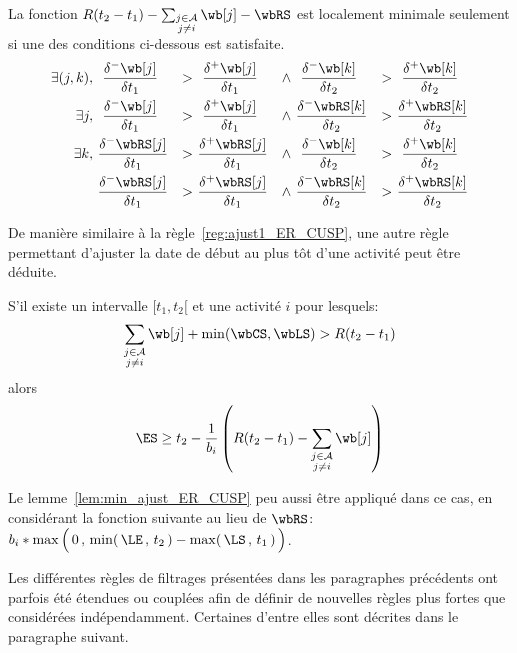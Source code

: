 \begin{lemma}
\label{lem:min_ajust_ER_CUSP}
La fonction $R(t_2-t_1) -\sum_{\substack{j \in \A \\ j \neq i}} \wb[j]
- \wbRS $ est localement minimale seulement si une des conditions
ci-dessous est satisfaite.
\begin{align} 
\exists (j,k), \ &~\frac{\delta^{-}\wb[j]}{\delta t_1}
&>~&~\frac{\delta^{+}\wb[j]}{\delta t_1}
&\land~&~\frac{\delta^{-}\wb[k]}{\delta t_2} & >~&
~\frac{\delta^{+}\wb[k]}{\delta t_2} \label{eq:deriv1_adj_CUSP}\\
\exists j , \ &~\frac{\delta^{-}\wb[j]}{\delta t_1}
&>~&~\frac{\delta^{+}\wb[j]}{\delta t_1}
&\land~&\frac{\delta^{-}\wbRS[k]}{\delta t_2} & >~&
\frac{\delta^{+}\wbRS[k]}{\delta t_2} \label{eq:deriv2_adj_CUSP}\\
\exists k, \ &\frac{\delta^{-}\wbRS[j]}{\delta t_1}
&>~&\frac{\delta^{+}\wbRS[j]}{\delta t_1}
&\land~&~\frac{\delta^{-}\wb[k]}{\delta t_2} & >~&
~\frac{\delta^{+}\wb[k]}{\delta t_2} \label{eq:deriv3_adj_CUSP}\\
 &\frac{\delta^{-}\wbRS[j]}{\delta t_1}
&>~&\frac{\delta^{+}\wbRS[j]}{\delta t_1}
&\land~&\frac{\delta^{-}\wbRS[k]}{\delta t_2} & >~&
\frac{\delta^{+}\wbRS[k]}{\delta t_2} \label{eq:deriv4_adj_CUSP}
\end{align}
\end{lemma}

De manière similaire à la règle~\ref{reg:ajust1_ER_CUSP}, une autre
règle permettant d'ajuster la date de début au plus tôt d'une activité
peut être déduite.

\begin{reg}
  \label{reg:ajust2_ER_CUSP}
  S'il existe un intervalle $[t_1,t_2[$ et une activité $i$ pour lesquels:
  \[ \sum_{\substack{j \in \A \\ j \neq i}} \wb[j] +
    \min(\wbCS,\wbLS) > R (t_2-t_1)\] 
  alors 
  \[  \ES \ge t_2 - \frac{1}{b_i} \left(R (t_2-t_1)  -\sum_{\substack{j \in \A \\ j
          \neq i}} \wb[j]  \right) \]
\end{reg}

Le lemme~\ref{lem:min_ajust_ER_CUSP} peu aussi être appliqué dans ce
cas, en considérant la fonction suivante au lieu de $\wbRS$:
$b_i*\max\Big(\, 0\, , \, \min(\, \LE\, ,\, t_2\,) - \max(\, \LS\, ,
  \, t_1\,) \,\Big)$. 

Les différentes règles de filtrages présentées dans les paragraphes
précédents ont parfois été étendues ou couplées afin de définir de
nouvelles règles plus fortes que considérées indépendamment. Certaines
d'entre elles sont décrites dans le paragraphe suivant. 


